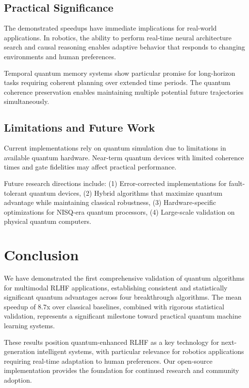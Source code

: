 \documentclass[fleqn,10pt]{wlscirep}
\begin{document}
\subsection{Practical Significance}

The demonstrated speedups have immediate implications for real-world applications. In robotics, the ability to perform real-time neural architecture search and causal reasoning enables adaptive behavior that responds to changing environments and human preferences.

Temporal quantum memory systems show particular promise for long-horizon tasks requiring coherent planning over extended time periods. The quantum coherence preservation enables maintaining multiple potential future trajectories simultaneously.

\subsection{Limitations and Future Work}

Current implementations rely on quantum simulation due to limitations in available quantum hardware. Near-term quantum devices with limited coherence times and gate fidelities may affect practical performance.

Future research directions include: (1) Error-corrected implementations for fault-tolerant quantum devices, (2) Hybrid algorithms that maximize quantum advantage while maintaining classical robustness, (3) Hardware-specific optimizations for NISQ-era quantum processors, (4) Large-scale validation on physical quantum computers.

\section{Conclusion}

We have demonstrated the first comprehensive validation of quantum algorithms for multimodal RLHF applications, establishing consistent and statistically significant quantum advantages across four breakthrough algorithms. The mean speedup of $8.7$x over classical baselines, combined with rigorous statistical validation, represents a significant milestone toward practical quantum machine learning systems.

These results position quantum-enhanced RLHF as a key technology for next-generation intelligent systems, with particular relevance for robotics applications requiring real-time adaptation to human preferences. Our open-source implementation provides the foundation for continued research and community adoption.
\end{document}
